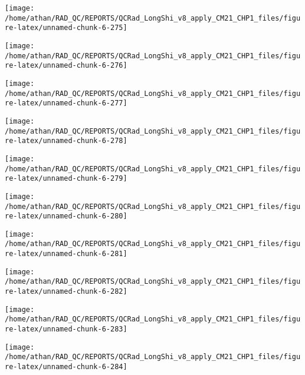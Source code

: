 \documentclass[
  10pt,
  a4paper,oneside]{article}
\begin{document}
\begin{center}\texttt{[image: /home/athan/RAD\_QC/REPORTS/QCRad\_LongShi\_v8\_apply\_CM21\_CHP1\_files/figure-latex/unnamed-chunk-6-275]} \end{center}

\begin{center}\texttt{[image: /home/athan/RAD\_QC/REPORTS/QCRad\_LongShi\_v8\_apply\_CM21\_CHP1\_files/figure-latex/unnamed-chunk-6-276]} \end{center}

\begin{center}\texttt{[image: /home/athan/RAD\_QC/REPORTS/QCRad\_LongShi\_v8\_apply\_CM21\_CHP1\_files/figure-latex/unnamed-chunk-6-277]} \end{center}

\begin{center}\texttt{[image: /home/athan/RAD\_QC/REPORTS/QCRad\_LongShi\_v8\_apply\_CM21\_CHP1\_files/figure-latex/unnamed-chunk-6-278]} \end{center}

\begin{center}\texttt{[image: /home/athan/RAD\_QC/REPORTS/QCRad\_LongShi\_v8\_apply\_CM21\_CHP1\_files/figure-latex/unnamed-chunk-6-279]} \end{center}

\begin{center}\texttt{[image: /home/athan/RAD\_QC/REPORTS/QCRad\_LongShi\_v8\_apply\_CM21\_CHP1\_files/figure-latex/unnamed-chunk-6-280]} \end{center}

\begin{center}\texttt{[image: /home/athan/RAD\_QC/REPORTS/QCRad\_LongShi\_v8\_apply\_CM21\_CHP1\_files/figure-latex/unnamed-chunk-6-281]} \end{center}

\begin{center}\texttt{[image: /home/athan/RAD\_QC/REPORTS/QCRad\_LongShi\_v8\_apply\_CM21\_CHP1\_files/figure-latex/unnamed-chunk-6-282]} \end{center}

\begin{center}\texttt{[image: /home/athan/RAD\_QC/REPORTS/QCRad\_LongShi\_v8\_apply\_CM21\_CHP1\_files/figure-latex/unnamed-chunk-6-283]} \end{center}

\begin{center}\texttt{[image: /home/athan/RAD\_QC/REPORTS/QCRad\_LongShi\_v8\_apply\_CM21\_CHP1\_files/figure-latex/unnamed-chunk-6-284]} \end{center}
\end{document}
